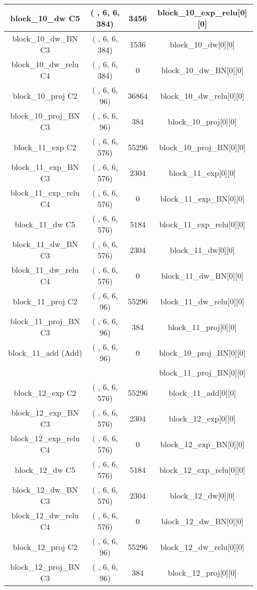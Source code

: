 \documentclass{bmvc2k}
\begin{document}
\begin{table}
\begin{tabular}{|c|c|c|c|}
block\_10\_dw C5 & ( , 6, 6, 384)  &  3456   &     block\_10\_exp\_relu[0][0]       \\ \hline
block\_10\_dw\_BN C3 & ( , 6, 6, 384)  &  1536   &     block\_10\_dw[0][0]         \\ \hline
block\_10\_dw\_relu C4  & ( , 6, 6, 384)  &  0      &     block\_10\_dw\_BN[0][0]      \\ \hline
block\_10\_proj C2       & ( , 6, 6, 96)   &  36864  &     block\_10\_dw\_relu[0][0]    \\ \hline
block\_10\_proj\_BN C3 & ( , 6, 6, 96)   &  384    &     block\_10\_proj[0][0]           \\ \hline
block\_11\_exp C2        & ( , 6, 6, 576)  &  55296  &     block\_10\_proj\_BN[0][0]        \\ \hline
block\_11\_exp\_BN C3 & ( , 6, 6, 576)  &  2304   &     block\_11\_exp[0][0]            \\ \hline
block\_11\_exp\_relu C4     & ( , 6, 6, 576)  &  0      &     block\_11\_exp\_BN[0][0]         \\ \hline
block\_11\_dw C5 & ( , 6, 6, 576)  &  5184   &     block\_11\_exp\_relu[0][0]       \\ \hline
block\_11\_dw\_BN C3 & ( , 6, 6, 576)  &  2304   &     block\_11\_dw[0][0]         \\ \hline
block\_11\_dw\_relu C4  & ( , 6, 6, 576)  &  0      &     block\_11\_dw\_BN[0][0]      \\ \hline
block\_11\_proj C2       & ( , 6, 6, 96)   &  55296  &     block\_11\_dw\_relu[0][0]    \\ \hline
block\_11\_proj\_BN C3 & ( , 6, 6, 96)   &  384    &     block\_11\_proj[0][0]           \\ \hline
block\_11\_add (Add)              & ( , 6, 6, 96)   &  0      &     block\_10\_proj\_BN[0][0]        \\ 
                                &                    &         &      block\_11\_proj\_BN[0][0]        \\ \hline
block\_12\_exp C2        & ( , 6, 6, 576)  &  55296  &     block\_11\_add[0][0]               \\ \hline
block\_12\_exp\_BN C3 & ( , 6, 6, 576)  &  2304   &     block\_12\_exp[0][0]            \\ \hline
block\_12\_exp\_relu C4     & ( , 6, 6, 576)  &  0      &     block\_12\_exp\_BN[0][0]         \\ \hline
block\_12\_dw C5 & ( , 6, 6, 576)  &  5184   &     block\_12\_exp\_relu[0][0]       \\ \hline
block\_12\_dw\_BN C3 & ( , 6, 6, 576)  &  2304   &     block\_12\_dw[0][0]         \\ \hline
block\_12\_dw\_relu C4  & ( , 6, 6, 576)  &  0      &     block\_12\_dw\_BN[0][0]      \\ \hline
block\_12\_proj C2       & ( , 6, 6, 96)   &  55296  &     block\_12\_dw\_relu[0][0]    \\ \hline
block\_12\_proj\_BN C3 & ( , 6, 6, 96)   &  384    &     block\_12\_proj[0][0]           \\ \hline


\end{tabular}
\end{table}
\end{document}
